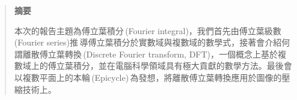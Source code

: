 \begin{quote}
  \begin{center}
    \large{\textbf{摘要}}
  \end{center}
  本次的報告主題為傅立葉積分\,(Fourier integral)，我們首先由傅立葉級數\,(Fourier series)推\,導傅立葉積分於實數域與複數域的數學式，接著會介紹何謂離散傅立葉轉換\,(Discrete Fourier transform, DFT)，一個概念上基於複數域上的傅立葉積分，並在電腦科學領域具有極大貢獻的數學方法。最後會以複數平面上的本輪\,(Epicycle)\,為發想，將離散傅立葉轉換應用於圖像的壓縮技術上。
\end{quote} 